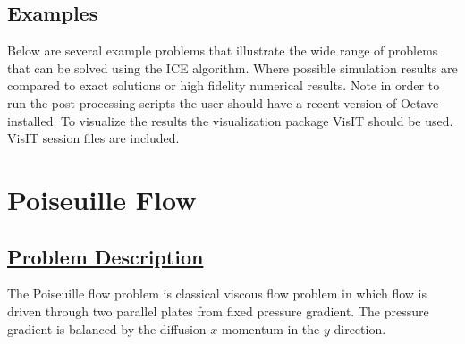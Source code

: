 \newpage
\subsection{Examples}
Below are several example problems that illustrate the wide range of problems
that can be solved using the ICE algorithm.  Where possible simulation
results are compared to exact solutions or high fidelity numerical results.
Note in order to run the post processing scripts the user should have a
recent version of Octave installed.  To visualize the results the visualization
package VisIT should be used.  VisIT session files are included.
 
\section*{\center Poiseuille Flow}
\subsection*{\underline{Problem Description}}
The Poiseuille flow problem is classical viscous flow problem in which flow is
driven through two parallel plates from fixed pressure gradient.  The pressure
gradient is balanced by the diffusion $x$ momentum in the $y$ direction.

